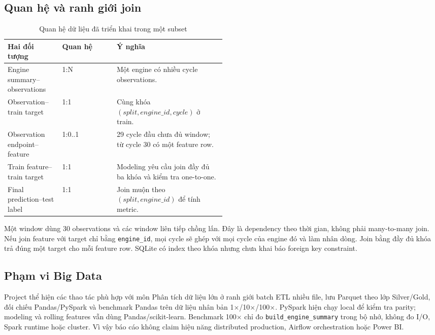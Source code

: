 \subsection{Quan hệ và ranh giới join}
\begin{table}[H]
\centering
\caption{Quan hệ dữ liệu đã triển khai trong một subset}
\label{tab:data-relations}
\begin{tabularx}{\linewidth}{L{0.25\linewidth}L{0.25\linewidth}X}
\toprule
Hai đối tượng & Quan hệ & Ý nghĩa \\
\midrule
Engine summary--observations & 1:N & Một engine có nhiều cycle observations. \\
Observation--train target & 1:1 & Cùng khóa $(split,engine\_id,cycle)$ ở train. \\
Observation endpoint--feature & 1:0..1 & 29 cycle đầu chưa đủ window; từ cycle 30 có một feature row. \\
Train feature--train target & 1:1 & Modeling yêu cầu join đầy đủ ba khóa và kiểm tra one-to-one. \\
Final prediction--test label & 1:1 & Join muộn theo $(split,engine\_id)$ để tính metric. \\
\bottomrule
\end{tabularx}
\end{table}

Một window dùng 30 observations và các window liên tiếp chồng lấn. Đây là
dependency theo thời gian, không phải many-to-many join. Nếu join feature với
target chỉ bằng \texttt{engine\_id}, mọi cycle sẽ ghép với mọi cycle của engine
đó và làm nhân dòng. Join bằng đầy đủ khóa trả đúng một target cho mỗi feature
row. SQLite có index theo khóa nhưng chưa khai báo foreign key constraint.

\subsection{Phạm vi Big Data}

Project thể hiện các thao tác phù hợp với môn Phân tích dữ liệu lớn ở ranh giới
batch ETL nhiều file, lưu Parquet theo lớp Silver/Gold, đối chiếu Pandas/PySpark
và benchmark Pandas trên dữ liệu nhân bản 1$\times$/10$\times$/100$\times$.
PySpark hiện chạy local để kiểm tra parity; modeling và rolling features vẫn dùng
Pandas/scikit-learn. Benchmark 100$\times$ chỉ đo \texttt{build\_engine\_summary}
trong bộ nhớ, không đo I/O, Spark runtime hoặc cluster. Vì vậy báo cáo không
claim hiệu năng distributed production, Airflow orchestration hoặc Power BI.
